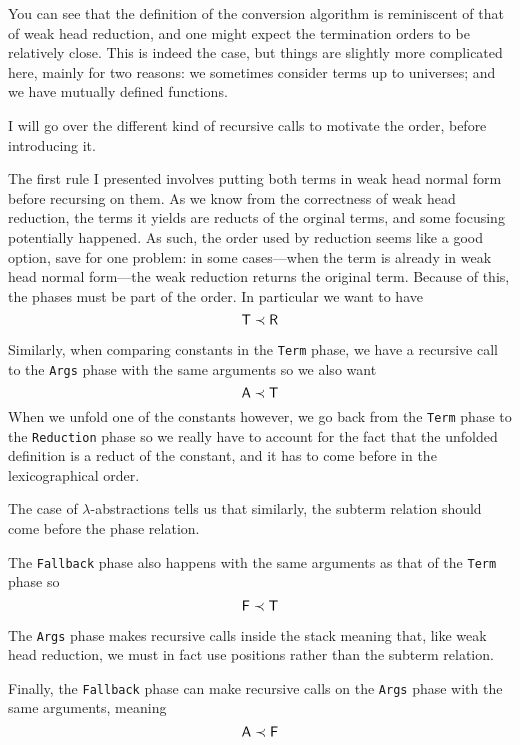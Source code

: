 You can see that the definition of the conversion algorithm is reminiscent of
that of weak head reduction, and one might expect the termination orders to be
relatively close. This is indeed the case, but things are slightly more
complicated here, mainly for two reasons: we sometimes consider terms up to
universes; and we have mutually defined functions.

I will go over the different kind of recursive calls to motivate the order,
before introducing it.

The first rule I presented involves putting both terms in weak head normal
form before recursing on them. As we know from the correctness of weak head
reduction, the terms it yields are reducts of the orginal terms, and some
focusing potentially happened. As such, the order used by reduction seems like
a good option, save for one problem: in some cases---when the term is already
in weak head normal form---the weak reduction returns the original term.
Because of this, the phases must be part of the order.
In particular we want to have
\[
  \mathsf{T} \prec \mathsf{R}
\]

Similarly, when comparing constants in the \texttt{Term} phase,
we have a recursive call to the \texttt{Args} phase with the same
arguments so we also want
\[
  \mathsf{A} \prec \mathsf{T}
\]
When we unfold one of the constants however, we go back from the
\texttt{Term} phase to the \texttt{Reduction} phase
so we really have to account for the fact that the unfolded definition is a
reduct of the constant, and it has to come before in the lexicographical
order.

The case of \(\lambda\)-abstractions tells us that similarly, the subterm
relation should come before the phase relation.

The \texttt{Fallback} phase also happens with the same arguments as
that of the \texttt{Term} phase so
\[
  \mathsf{F} \prec \mathsf{T}
\]

The \texttt{Args} phase makes recursive calls inside the stack meaning
that, like weak head reduction, we must in fact use positions rather than the
subterm relation.

Finally, the \texttt{Fallback} phase can make recursive calls on the
\texttt{Args} phase with the same arguments, meaning
\[
  \mathsf{A} \prec \mathsf{F}
\]


